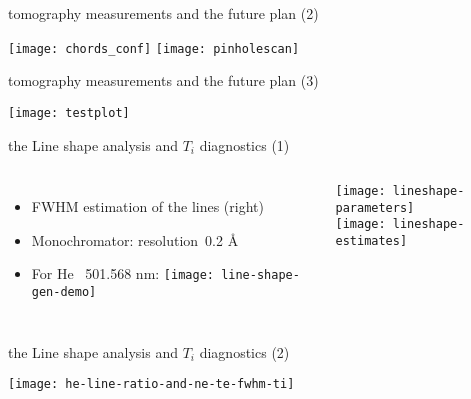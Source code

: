 \begin{CJK*}{UTF8}{kai}
\begin{frame}{tomography measurements and the future plan (2)}
    \vspace{-0.5em}
    \begin{center}
        \texttt{[image: chords\_conf]}
        \texttt{[image: pinholescan]}
    \end{center}
\end{frame}

\begin{frame}{tomography measurements and the future plan (3)}
    \vspace{-0.5em}
    \begin{center}
        \texttt{[image: testplot]}
    \end{center}
\end{frame}

\begin{frame}{the Line shape analysis and $T_i$ diagnostics (1)}
    \begin{columns}
      \centering
      \begin{itemize}
        \item FWHM estimation of the lines (right)
        \item Monochromator: resolution~0.2 \AA%
        \item For He ~501.568 nm:
            \texttt{[image: line-shape-gen-demo]}
      \end{itemize}

      \begin{center}
        \texttt{[image: lineshape-parameters]}\\
		\texttt{[image: lineshape-estimates]}
      \end{center}
    \end{columns}
\end{frame}

\begin{frame}{the Line shape analysis and $T_i$ diagnostics (2)}
    \vspace{-0.5em}
    \begin{center}
        \texttt{[image: he-line-ratio-and-ne-te-fwhm-ti]}
    \end{center}
\end{frame}


\end{CJK*}
